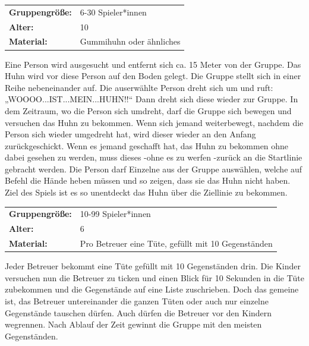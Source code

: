 \begin{table}[H]
\begin{tabular}{>{\bfseries}lp{8cm}}
   Gruppengröße:   & 6-30 Spieler*innen\\
    Alter: & 10 \\
    Material: & Gummihuhn oder ähnliches \\ 
\end{tabular}
\end{table} 

Eine Person wird ausgesucht und entfernt sich ca. 15 Meter von der Gruppe. Das Huhn wird vor diese Person auf den Boden gelegt. Die Gruppe stellt sich in einer Reihe nebeneinander auf. Die auserwählte Person dreht sich um und ruft: „WOOOO...IST...MEIN...HUHN!!“ Dann dreht sich diese wieder zur Gruppe. In dem Zeitraum, wo die Person sich umdreht, darf die Gruppe sich bewegen und versuchen das Huhn zu bekommen. Wenn sich jemand weiterbewegt, nachdem die Person sich wieder umgedreht hat, wird dieser wieder an den Anfang zurückgeschickt. Wenn es jemand geschafft hat, das Huhn zu bekommen ohne dabei gesehen zu werden, muss dieses -ohne es zu werfen -zurück an die \newline
Startlinie gebracht werden. Die Person darf Einzelne aus der Gruppe auswählen, welche auf Befehl die Hände heben müssen und so zeigen, dass sie das Huhn nicht haben. Ziel des Spiels ist es so  unentdeckt das Huhn über die Ziellinie zu bekommen. \\



\begin{table}[H]
\begin{tabular}{>{\bfseries}lp{8cm}}
   Gruppengröße:   & 10-99 Spieler*innen\\
    Alter: & 6 \\
    Material: & Pro Betreuer eine Tüte, gefüllt mit 10 Gegenständen \\ 
\end{tabular}
\end{table} 
Jeder Betreuer bekommt eine Tüte gefüllt mit 10 Gegenständen drin. Die Kinder versuchen nun die Betreuer zu ticken und einen Blick für 10 Sekunden in die Tüte zubekommen und die Gegenstände auf eine Liste zuschrieben. Doch das gemeine ist, das Betreuer untereinander die ganzen Tüten oder auch nur einzelne Gegenstände tauschen dürfen. Auch dürfen die Betreuer vor den Kindern wegrennen. Nach Ablauf der Zeit gewinnt die Gruppe mit den meisten Gegenständen.  \\




